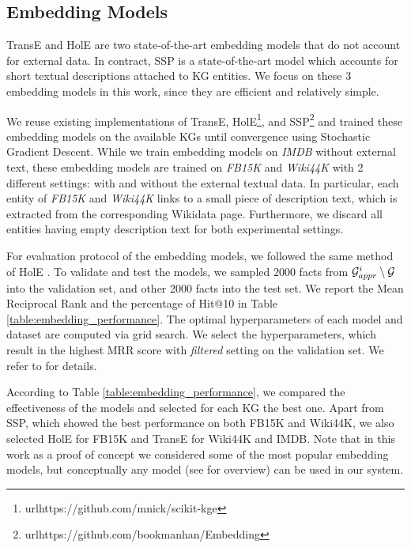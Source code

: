 \subsection{Embedding Models} 

TransE \cite{Bordes:NIPS2013} and HolE \cite{DBLP:conf/aaai/NickelRP16} are two state-of-the-art embedding models that do not account for external data. In contract, SSP \cite{DBLP:conf/aaai/0005HMZ17} is a state-of-the-art model which accounts for short textual descriptions attached to KG entities. We focus on these 3 embedding models in this work, since they are efficient and relatively simple.


We reuse existing implementations of TransE, HolE\footnote{url{https://github.com/mnick/scikit-kge}}, and SSP\footnote{url{https://github.com/bookmanhan/Embedding}} and trained these embedding models on the available KGs until convergence using Stochastic Gradient Descent. While we train embedding models on \textit{IMDB} without external text, these embedding models are trained on \textit{FB15K} and \textit{Wiki44K} with 2 different settings: with and without the external textual data. In particular, each entity of \textit{FB15K} and \textit{Wiki44K} links to a small piece of description text, which is extracted from the corresponding Wikidata page. Furthermore, we discard all entities having empty description text for both experimental settings.

For evaluation protocol of the embedding models, we followed the same method of HolE \cite{DBLP:conf/aaai/NickelRP16}. To validate and test the models, we sampled 2000 facts from $\mathcal{G}^i_{appr} \setminus \mathcal{G}$ into the validation set, and other 2000 facts into the test set. We report the Mean Reciprocal Rank and the percentage of Hit@10 in Table \ref{table:embedding_performance}. The optimal hyperparameters  of each model and dataset are computed via grid search. We select the hyperparameters, which result in the highest MRR score with \textit{filtered} setting on the validation set. We refer to \cite{DBLP:conf/aaai/NickelRP16} for details.

According to Table \ref{table:embedding_performance}, we compared the effectiveness of the models and selected for each KG the best one. Apart from SSP, which showed the best performance on both FB15K and Wiki44K, we also selected HolE for FB15K and TransE for Wiki44K and IMDB. Note that in this work as a proof of concept we considered some of the most popular embedding models, but conceptually any model (see \cite{DBLP:journals/tkde/WangMWG17} for overview) can be used in our system.

